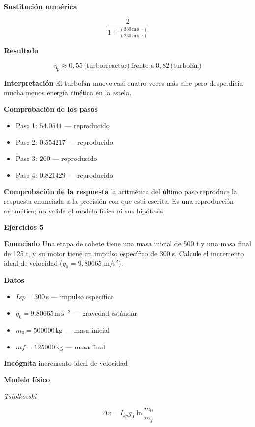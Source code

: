 \documentclass[10pt,openany]{book}
\begin{document}
\noindent\textbf{Sustitución numérica}

\[
\frac{2}{1 + \frac{\left(330\,\mathrm{m}\,\mathrm{s}^{-1}\right)}{\left(230\,\mathrm{m}\,\mathrm{s}^{-1}\right)}}
\]

\noindent\textbf{Resultado}

\[
\eta_p \approx 0{,}55\ \text{(turborreactor)}\ \text{frente a}\ 0{,}82\ \text{(turbofán)}
\]

\noindent\textbf{Interpretación}
El turbofán mueve casi cuatro veces más aire pero desperdicia mucha menos energía cinética en la estela.

\noindent\textbf{Comprobación de los pasos}
\begin{itemize}
\item Paso 1: $54.0541$ — reproducido
\item Paso 2: $0.554217$ — reproducido
\item Paso 3: $200$ — reproducido
\item Paso 4: $0.821429$ — reproducido
\end{itemize}

\noindent\textbf{Comprobación de la respuesta} la aritmética del último paso reproduce la respuesta enunciada a la precisión con que está escrita. Es una reproducción aritmética; no valida el modelo físico ni sus hipótesis.

\noindent\textbf{Ejercicios 5}

\noindent\textbf{Enunciado}
Una etapa de cohete tiene una masa inicial de 500 t y una masa final de 125 t, y su motor tiene un impulso específico de 300 s. Calcule el incremento ideal de velocidad (\(g_0 = 9{,}80665\) m/s\(^2\)).

\noindent\textbf{Datos}
\begin{itemize}
\item $Isp = 300\,\mathrm{s}$ — impulso específico
\item $g_{0} = 9.80665\,\mathrm{m}\,\mathrm{s}^{-2}$ — gravedad estándar
\item $m_{0} = 500000\,\mathrm{kg}$ — masa inicial
\item $mf = 125000\,\mathrm{kg}$ — masa final
\end{itemize}

\noindent\textbf{Incógnita}
incremento ideal de velocidad

\noindent\textbf{Modelo físico}

\noindent\textit{Tsiolkovski}

\[
\Delta v = I_{sp} g_0\ln\frac{m_0}{m_f}
\]
\end{document}
